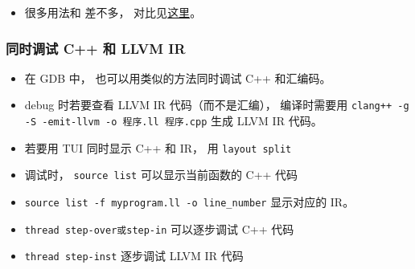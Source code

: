 
\begin{issues}
\issueDraft
\end{issues}


\begin{itemize}
\item 很多用法和  差不多， 对比见\href{https://lldb.llvm.org/use/map.html}{这里}。
\end{itemize}

\subsubsection{同时调试 C++ 和 LLVM IR}
\begin{itemize}
\item 在 GDB 中， 也可以用类似的方法同时调试 C++ 和汇编码。
\item debug 时若要查看 LLVM IR 代码（而不是汇编）， 编译时需要用 \verb`clang++ -g -S -emit-llvm -o 程序.ll 程序.cpp` 生成 LLVM IR 代码。
\item 若要用 TUI 同时显示 C++ 和 IR， 用 \verb`layout split`
\item 调试时， \verb`source list` 可以显示当前函数的 C++ 代码
\item \verb`source list -f myprogram.ll -o line_number` 显示对应的 IR。
\item \verb`thread step-over或step-in` 可以逐步调试 C++ 代码
\item \verb`thread step-inst` 逐步调试 LLVM IR 代码
\end{itemize}
